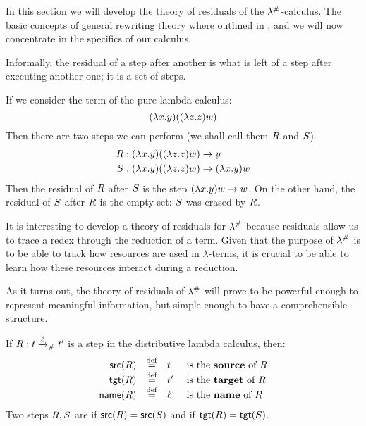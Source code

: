 In this section we will develop the theory of residuals of the $\lambda^{\mathtt{\#}}$-calculus.
The basic concepts of general rewriting theory where outlined in ,
and we will now concentrate in the specifics of our calculus.

Informally, the residual of a step after another is what is left of a step after executing another one; it is a set of steps.

\begin{example} If we consider the term of the pure lambda calculus:
\[(\lambda x. y)((\lambda z. z) w)\]
Then there are two steps we can perform (we shall call them $R$ and $S$).
\begin{align*}
  R &:
    (\lambda x. y)((\lambda z. z) w) \to y \\
  S &:
    (\lambda x. y)((\lambda z. z) w) \to (\lambda x. y) w
\end{align*}
Then the residual of $R$ after $S$ is the step $(\lambda x. y) w \to w$.
On the other hand, the residual of $S$ after $R$ is the empty set:
$S$ was erased by $R$.
\end{example}

It is interesting to develop a theory of residuals for $\lambda^{\mathtt{\#}}$ because
residuals allow us to trace a redex through the reduction of a term.
Given that the purpose of $\lambda^{\mathtt{\#}}$ is to be able to track
how resources are used in $\lambda$-terms, it is crucial to
be able to learn how these resources interact during a reduction.

As it turns out, the theory of residuals of $\lambda^{\mathtt{\#}}$ will prove to be powerful
enough to represent meaningful information, but simple enough to have a
comprehensible structure.


\begin{definition}
If $R : t \mathrel{\xrightarrow{\ell}_{\mathtt{\#}}} t'$ is a step in the distributive lambda
calculus, then:
\[
  \begin{array}{rcll}
    \mathsf{src}(R) & \overset{\mathrm{def}}{=} & t & \text{ is the {\bf source} of $R$} \\
    \mathsf{tgt}(R) & \overset{\mathrm{def}}{=} & t' & \text{ is the {\bf target} of $R$} \\
    \mathsf{name}(R) & \overset{\mathrm{def}}{=} & \ell & \text{ is the {\bf name} of $R$}
  \end{array}
\]
Two steps $R, S$
are  if $\mathsf{src}(R) = \mathsf{src}(S)$
and  if $\mathsf{tgt}(R) = \mathsf{tgt}(S)$.
\end{definition}

